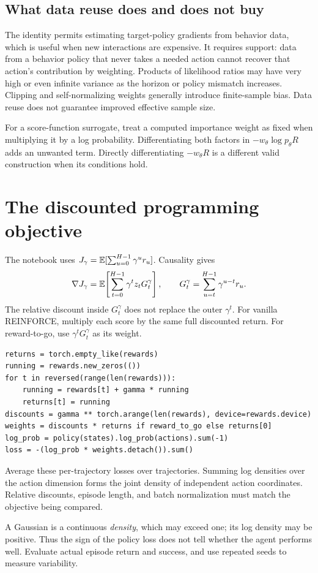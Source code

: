 \newpage
\subsection{What data reuse does and does not buy}
The identity permits estimating target-policy gradients from behavior data,
which is useful when new interactions are expensive. It requires support:
data from a behavior policy that never takes a needed action cannot recover
that action's contribution by weighting. Products of likelihood ratios may
have very high or even infinite variance as the horizon or policy mismatch
increases. Clipping and self-normalizing weights generally introduce
finite-sample bias. Data reuse does not guarantee improved effective sample size.

For a score-function surrogate, treat a computed importance weight as fixed
when multiplying it by a log probability. Differentiating both factors in
$-w_\theta\log p_\theta R$ adds an unwanted term. Directly differentiating
$-w_\theta R$ is a different valid construction when its conditions hold.

\section{The discounted programming objective}
The notebook uses $J_\gamma=\mathbb{E}[\sum_{u=0}^{H-1}\gamma^ur_u]$. Causality gives
\[
 \nabla J_\gamma
 =\mathbb{E}\!\left[\sum_{t=0}^{H-1}\gamma^t z_tG_t^\gamma\right],\qquad
 G_t^\gamma=\sum_{u=t}^{H-1}\gamma^{u-t}r_u.
\]
The relative discount inside $G_t^\gamma$ does not replace the outer
$\gamma^t$. For vanilla REINFORCE, multiply each score by the same full
discounted return. For reward-to-go, use $\gamma^tG_t^\gamma$ as its weight.
\begin{lstlisting}
returns = torch.empty_like(rewards)
running = rewards.new_zeros(())
for t in reversed(range(len(rewards))):
    running = rewards[t] + gamma * running
    returns[t] = running
discounts = gamma ** torch.arange(len(rewards), device=rewards.device)
weights = discounts * returns if reward_to_go else returns[0]
log_prob = policy(states).log_prob(actions).sum(-1)
loss = -(log_prob * weights.detach()).sum()
\end{lstlisting}
Average these per-trajectory losses over trajectories. Summing log densities
over the action dimension forms the joint density of independent action
coordinates. Relative discounts, episode length, and batch normalization
must match the objective being compared.

A Gaussian is a continuous \emph{density}, which may exceed one; its log
density may be positive. Thus the sign of the policy loss does not tell
whether the agent performs well. Evaluate actual episode return and success,
and use repeated seeds to measure variability.

